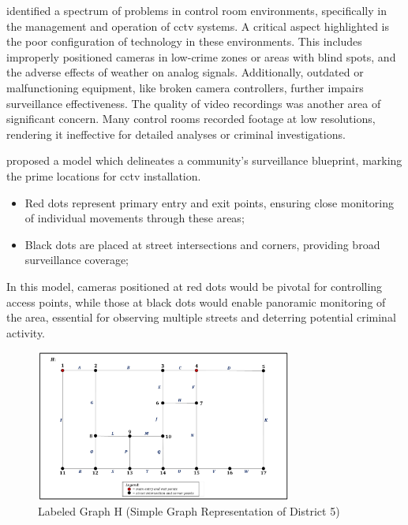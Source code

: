 \citet{rfc42} identified a spectrum of problems in control room environments, specifically in the management and operation of \ac{cctv} systems. A critical aspect highlighted is the poor configuration of technology in these environments. This includes improperly positioned cameras in low-crime zones or areas with blind spots, and the adverse effects of weather on analog signals. Additionally, outdated or malfunctioning equipment, like broken camera controllers, further impairs surveillance effectiveness. The quality of video recordings was another area of significant concern. Many control rooms recorded footage at low resolutions, rendering it ineffective for detailed analyses or criminal investigations.

\citet{rfc46} proposed a model which delineates a community's surveillance blueprint, marking the prime locations for \ac{cctv} installation. 
\begin{itemize}
    \item Red dots represent primary entry and exit points, ensuring close monitoring of individual movements through these areas;
    \item Black dots are placed at street intersections and corners, providing broad surveillance coverage;
\end{itemize}

In this model, cameras positioned at red dots 
would be pivotal for controlling access points, while those at black dots would enable panoramic monitoring 
of the area, essential for observing multiple streets and deterring potential criminal activity. 

\begin{figure}[h]
    \centering 
    \includegraphics[width=0.75\textwidth]{figs/cctv-positions.png} 
    \caption{Labeled Graph H (Simple Graph Representation of District 5) \cite{rfc46}}
    \label{fig:cctv-positions}
\end{figure}


